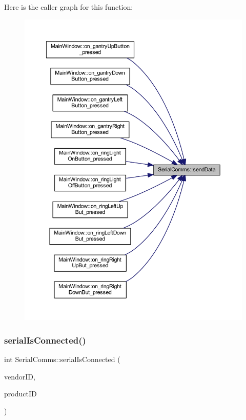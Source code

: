 Here is the caller graph for this function\+:
\nopagebreak
\begin{figure}[H]
\begin{center}
\leavevmode
\includegraphics[width=350pt]{classSerialComms_abcbc3cce26ff395684de26a07da7ca26_icgraph}
\end{center}
\end{figure}
\mbox{\label{classSerialComms_ad9980837a7d0672d100b0b83e3e47451}} 
\subsubsection{\texorpdfstring{serialIsConnected()}{serialIsConnected()}}
{\footnotesize\ttfamily int Serial\+Comms\+::serial\+Is\+Connected (\begin{DoxyParamCaption}\item[{Q\+String}]{vendor\+ID,  }\item[{Q\+String}]{product\+ID }\end{DoxyParamCaption})}



